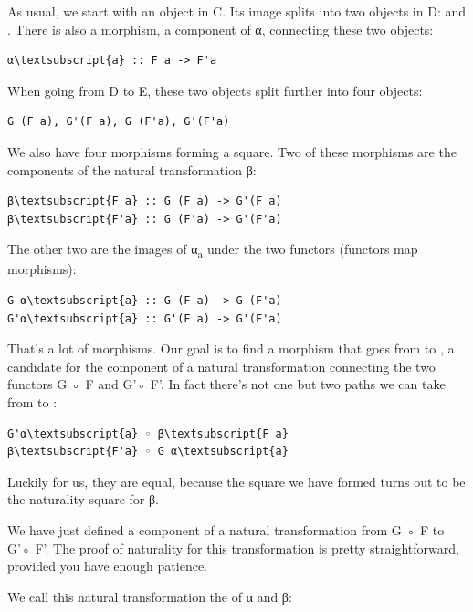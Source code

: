 \noindent
As usual, we start with an object  in C. Its image splits into
two objects in D:  and . There is also a
morphism, a component of α, connecting these two objects:

\begin{Verbatim}[commandchars=\\\{\}]
α\textsubscript{a} :: F a -> F'a
\end{Verbatim}
When going from D to E, these two objects split further into four
objects:

\begin{Verbatim}[commandchars=\\\{\}]
G (F a), G'(F a), G (F'a), G'(F'a)
\end{Verbatim}
We also have four morphisms forming a square. Two of these morphisms are
the components of the natural transformation β:

\begin{Verbatim}[commandchars=\\\{\}]
β\textsubscript{F a} :: G (F a) -> G'(F a)
β\textsubscript{F'a} :: G (F'a) -> G'(F'a)
\end{Verbatim}
The other two are the images of α\textsubscript{a} under the two
functors (functors map morphisms):

\begin{Verbatim}[commandchars=\\\{\}]
G α\textsubscript{a} :: G (F a) -> G (F'a)
G'α\textsubscript{a} :: G'(F a) -> G'(F'a)
\end{Verbatim}
That's a lot of morphisms. Our goal is to find a morphism that goes from
 to , a candidate for the
component of a natural transformation connecting the two functors G ◦ F
and G'◦ F'. In fact there's not one but two paths we can take from
 to :

\begin{Verbatim}[commandchars=\\\{\}]
G'α\textsubscript{a} ◦ β\textsubscript{F a}
β\textsubscript{F'a} ◦ G α\textsubscript{a}
\end{Verbatim}
Luckily for us, they are equal, because the square we have formed turns
out to be the naturality square for β.

We have just defined a component of a natural transformation from G ◦ F
to G'◦ F'. The proof of naturality for this transformation is pretty
straightforward, provided you have enough patience.

We call this natural transformation the  of
α and β:

